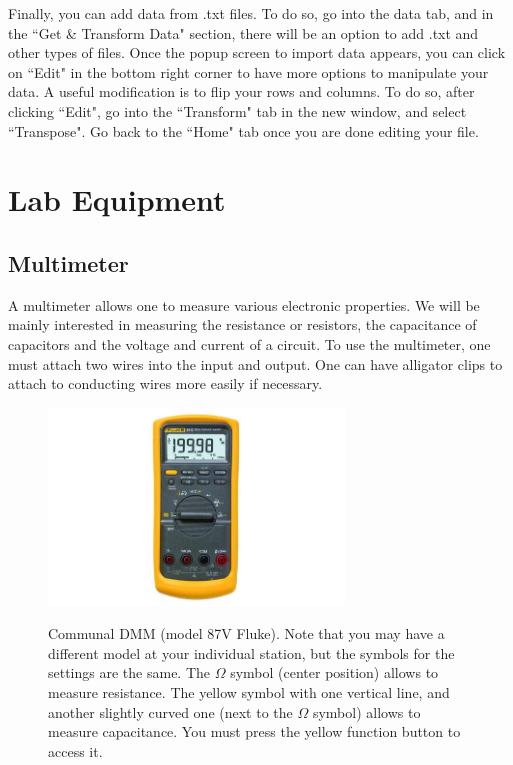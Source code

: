 \documentclass[12pt]{report}
\begin{document}
\begin{appendix}
Finally, you can add data from .txt files. To do so, go into the data tab, and in the ``Get \& Transform Data" section, there will be an option to add .txt and other types of files. Once the popup screen to import data appears, you can click on ``Edit" in the bottom right corner to have more options to manipulate your data. A useful modification is to flip your rows and columns. To do so, after clicking ``Edit", go into the ``Transform" tab in the new window, and select ``Transpose". Go back to the ``Home" tab once you are done editing your file.


\chapter{Lab Equipment}

\section{Multimeter}
A multimeter allows one to measure various electronic properties. We will be mainly interested in measuring the resistance or resistors, the capacitance of capacitors and the voltage and current of a circuit. To use the multimeter, one must attach two wires into the input and output. One can have alligator clips to attach to conducting wires more easily if necessary.

\begin{figure}[h]
\centering
\includegraphics[width=0.7\textwidth]{appendix-DMM.png}
\label{Fig:App-DMM}
\caption{Communal DMM (model 87V Fluke). Note that you may have a different model at your individual station, but the symbols for the settings are the same. The $\Omega$ symbol (center position) allows to measure resistance. The yellow symbol with one vertical line, and another slightly curved one (next to the $\Omega$ symbol) allows to measure capacitance. You must press the yellow function button to access it.}
\end{figure}


\end{appendix}
\end{document}
